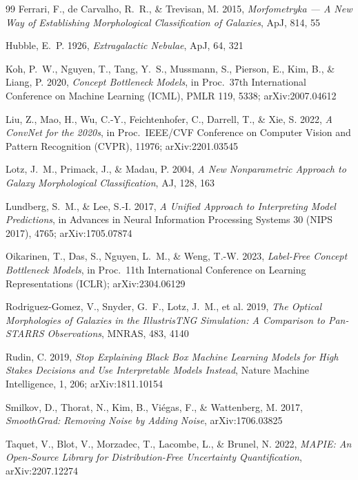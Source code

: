 \documentclass[11pt]{article}
\providecommand{\aj}{AJ}
\providecommand{\apj}{ApJ}
\providecommand{\mnras}{MNRAS}
\begin{document}
\begin{thebibliography}{99}
Ferrari, F., de Carvalho, R.~R., \& Trevisan, M. 2015,
\emph{Morfometryka --- A New Way of Establishing Morphological Classification
of Galaxies}, \apj, 814, 55

Hubble, E.~P. 1926, \emph{Extragalactic Nebulae}, \apj, 64, 321

Koh, P.~W., Nguyen, T., Tang, Y.~S., Mussmann, S., Pierson, E., Kim, B., \&
Liang, P. 2020, \emph{Concept Bottleneck Models}, in Proc.\ 37th International
Conference on Machine Learning (ICML), PMLR 119, 5338; arXiv:2007.04612

Liu, Z., Mao, H., Wu, C.-Y., Feichtenhofer, C., Darrell, T., \& Xie, S. 2022,
\emph{A ConvNet for the 2020s}, in Proc.\ IEEE/CVF Conference on Computer
Vision and Pattern Recognition (CVPR), 11976; arXiv:2201.03545

Lotz, J.~M., Primack, J., \& Madau, P. 2004, \emph{A New Nonparametric
Approach to Galaxy Morphological Classification}, \aj, 128, 163

Lundberg, S.~M., \& Lee, S.-I. 2017, \emph{A Unified Approach to Interpreting
Model Predictions}, in Advances in Neural Information Processing Systems 30
(NIPS 2017), 4765; arXiv:1705.07874

Oikarinen, T., Das, S., Nguyen, L.~M., \& Weng, T.-W. 2023,
\emph{Label-Free Concept Bottleneck Models}, in Proc.\ 11th International
Conference on Learning Representations (ICLR); arXiv:2304.06129

Rodriguez-Gomez, V., Snyder, G.~F., Lotz, J.~M., et al. 2019,
\emph{The Optical Morphologies of Galaxies in the IllustrisTNG Simulation: A
Comparison to Pan-STARRS Observations}, \mnras, 483, 4140

Rudin, C. 2019, \emph{Stop Explaining Black Box Machine Learning Models for
High Stakes Decisions and Use Interpretable Models Instead}, Nature Machine
Intelligence, 1, 206; arXiv:1811.10154

Smilkov, D., Thorat, N., Kim, B., Viégas, F., \& Wattenberg, M. 2017,
\emph{SmoothGrad: Removing Noise by Adding Noise}, arXiv:1706.03825

Taquet, V., Blot, V., Morzadec, T., Lacombe, L., \& Brunel, N. 2022,
\emph{MAPIE: An Open-Source Library for Distribution-Free Uncertainty
Quantification}, arXiv:2207.12274


\end{thebibliography}
\end{document}
